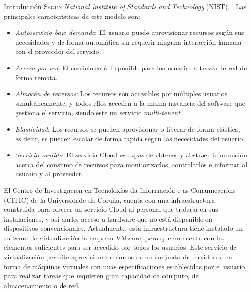\begin{chapter}{Introducción}
\label{chap:introducion}
\lettrine{S}{egún} \textit{National Institute of Standards and Technology} (NIST), \cite{computing}. Las principales características de este modelo son\label{nist}:
\begin{itemize}
    \item \emph{Autoservicio bajo demanda}: El usuario puede aprovisionar recursos según sus necesidades y de forma automática sin requerir ninguna interacción humana con el proveedor del servicio.
    \item \emph{Acceso por red}: El servicio está disponible para los usuarios a través de red de forma remota.
    \item \emph{Almacén de recursos}: Los recursos son accesibles por múltiples usuarios simultáneamente, y todos ellos acceden a la misma instancia del software que gestiona el servicio, siendo este un servicio \textit{multi-tenant}.
    \item \emph{Elasticidad}: Los recursos se pueden aprovisionar o liberar de forma elástica, es decir, se pueden escalar de forma rápida según las necesidades del usuario.
    \item \emph{Servicio medido}: El servicio Cloud es capaz de obtener y abstraer información acerca del consumo de recursos para monitorizarlos, controlarlos e informar al usuario y al proveedor.
\end{itemize}

 El Centro de Investigación en Tecnoloxías da Información e as Comunicacións (CITIC) de la Universidade da Coruña, cuenta con una infraestructura construida para ofrecer un servicio Cloud al personal que trabaja en sus instalaciones, y así darles acceso a hardware que no está disponible en dispositivos convencionales. Actualmente, esta infraestructura tiene instalado un software de virtualización la empresa VMware, pero que no cuenta con los elementos suficientes para ser accedido por todos los usuarios. Este servicio de virtualización permite aprovisionar recursos de un conjunto de servidores, en forma de máquinas virtuales con unas especificaciones establecidas por el usuario, para realizar tareas que requieren gran capacidad de cómputo, de almacenamiento o de red.


\end{chapter}
